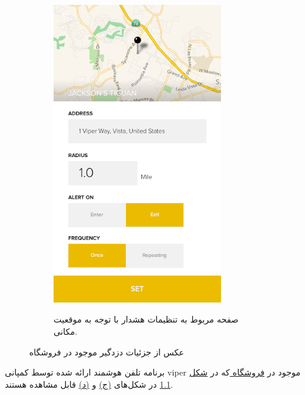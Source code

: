 \documentclass[a4paper,12pt]{report}
\begin{document}
\begin{figure}[!h]
\begin{subfigure}[t]{0.3\linewidth}
			\includegraphics[width=0.8\textwidth]{resources/viper_smart_start_2.jpg}
			\label{subfig4:fig1:sec3:chap1}
			\caption{
				صفحه مربوط به تنظیمات هشدار با توجه به موقعیت مکانی.
			}
		\end{subfigure}
		\normalsize
		\label{fig1:sec3:chap1}
		\caption{
			عکس از جزئیات دزدگیر
			موجود در فروشگاه
			\hyperref{https://www.amazon.com/Viper-5906V-Color-Remote-Security/dp/B00H0874IG}{car alarm unboxed}{Viper 5906V}{}
		}
	\end{figure}

	برنامه تلفن هوشمند ارائه شده توسط کمپانی
	viper
	موجود در
	\hyperref{https://play.google.com/store/apps/details?id=com.directed.android.viper&hl=en&gl=US}{car alarm application}{Viper 5906V}{فروشگاه }
	که در
	\hyperref[fig1:sec3:chap1]{شکل 1.1}
	 در شکل‌های
	\hyperref[subfig3:fig1:sec3:chap1]{(ج)}
	و
	\hyperref[subfig3:fig1:sec3:chap1]{(د)}
	قابل مشاهده هستند.
\end{document}
